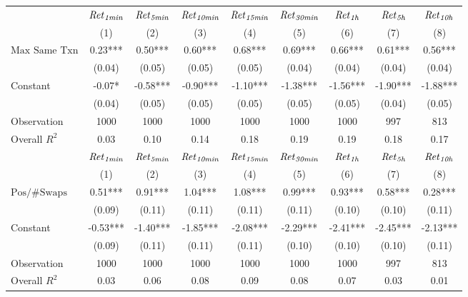 \begin{tabular}{lcccccccc}
\hline
 & ${\it Ret}_{\it 1min}$ & ${\it Ret}_{\it 5min}$ & ${\it Ret}_{\it 10min}$ & ${\it Ret}_{\it 15min}$ & ${\it Ret}_{\it 30min}$ & ${\it Ret}_{\it 1h}$ & ${\it Ret}_{\it 5h}$ & ${\it Ret}_{\it 10h}$ \\
 & (1) & (2) & (3) & (4) & (5) & (6) & (7) & (8) \\
\hline
$\text{Max Same Txn}$ & 0.23*** & 0.50*** & 0.60*** & 0.68*** & 0.69*** & 0.66*** & 0.61*** & 0.56*** \\
 & (0.04) & (0.05) & (0.05) & (0.05) & (0.04) & (0.04) & (0.04) & (0.04) \\
Constant & -0.07* & -0.58*** & -0.90*** & -1.10*** & -1.38*** & -1.56*** & -1.90*** & -1.88*** \\
 & (0.04) & (0.05) & (0.05) & (0.05) & (0.05) & (0.05) & (0.04) & (0.05) \\
Observation & 1000 & 1000 & 1000 & 1000 & 1000 & 1000 & 997 & 813 \\
Overall $R^2$ & 0.03 & 0.10 & 0.14 & 0.18 & 0.19 & 0.19 & 0.18 & 0.17 \\
\hline
 & ${\it Ret}_{\it 1min}$ & ${\it Ret}_{\it 5min}$ & ${\it Ret}_{\it 10min}$ & ${\it Ret}_{\it 15min}$ & ${\it Ret}_{\it 30min}$ & ${\it Ret}_{\it 1h}$ & ${\it Ret}_{\it 5h}$ & ${\it Ret}_{\it 10h}$ \\
 & (1) & (2) & (3) & (4) & (5) & (6) & (7) & (8) \\
\hline
$\text{Pos/\#Swaps}$ & 0.51*** & 0.91*** & 1.04*** & 1.08*** & 0.99*** & 0.93*** & 0.58*** & 0.28*** \\
 & (0.09) & (0.11) & (0.11) & (0.11) & (0.11) & (0.10) & (0.10) & (0.11) \\
Constant & -0.53*** & -1.40*** & -1.85*** & -2.08*** & -2.29*** & -2.41*** & -2.45*** & -2.13*** \\
 & (0.09) & (0.11) & (0.11) & (0.11) & (0.10) & (0.10) & (0.10) & (0.11) \\
Observation & 1000 & 1000 & 1000 & 1000 & 1000 & 1000 & 997 & 813 \\
Overall $R^2$ & 0.03 & 0.06 & 0.08 & 0.09 & 0.08 & 0.07 & 0.03 & 0.01 \\
\hline
\end{tabular}
